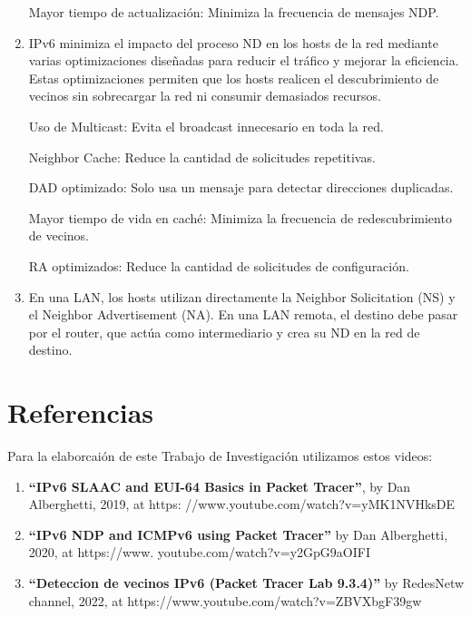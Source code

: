 \documentclass[12pt]{article}
\begin{document}
\begin{enumerate}
 	\hspace{2cm}Mayor tiempo de actualización: Minimiza la frecuencia de mensajes NDP.
 	
 	\item IPv6 minimiza el impacto del proceso ND en los hosts de la red mediante varias optimizaciones diseñadas para reducir el tráfico y mejorar la eficiencia. Estas optimizaciones permiten que los hosts realicen el descubrimiento de vecinos sin sobrecargar la red ni consumir demasiados recursos.
 	
 	\hspace{2cm}Uso de Multicast: Evita el broadcast innecesario en toda la red.
 	
 	\hspace{2cm}Neighbor Cache: Reduce la cantidad de solicitudes repetitivas.
 	
 	\hspace{2cm}DAD optimizado: Solo usa un mensaje para detectar direcciones duplicadas.
 	
 	\hspace{2cm}Mayor tiempo de vida en caché: Minimiza la frecuencia de redescubrimiento de vecinos.
 	
 	\hspace{2cm}RA optimizados: Reduce la cantidad de solicitudes de configuración.
 	
 	
 	\item En una LAN, los hosts utilizan directamente la Neighbor Solicitation (NS) y el  Neighbor Advertisement (NA). En una LAN remota, el destino debe pasar por el router, que actúa como intermediario y crea su ND en la red de destino.
 	
 	
 \end{enumerate}
 
 \section{Referencias}
 Para la elaborcaión de este Trabajo de Investigación utilizamos estos videos:
 
  \begin{enumerate}
 	\item \textbf{“IPv6 SLAAC and EUI-64 Basics in Packet Tracer”}, by Dan Alberghetti, 2019, at https:
 	//www.youtube.com/watch?v=yMK1NVHksDE
 	
 	\item \textbf{“IPv6 NDP and ICMPv6 using Packet Tracer”} by Dan Alberghetti, 2020, at https://www.
 	youtube.com/watch?v=y2GpG9aOIFI
 	
 	\item \textbf{“Deteccion de vecinos IPv6 (Packet Tracer Lab 9.3.4)”} by RedesNetw channel, 2022, at
 	https://www.youtube.com/watch?v=ZBVXbgF39gw
 	
 \end{enumerate}
 
\end{document}
